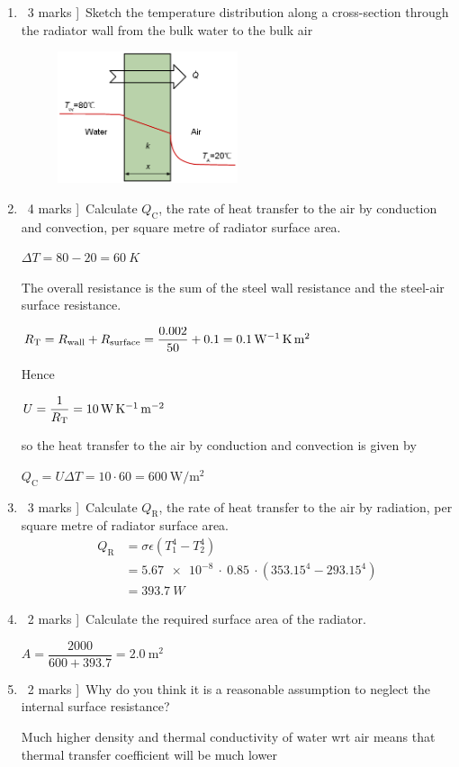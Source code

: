 \documentclass[a4paper,12pt,fleqn]{article}
\begin{document}
\begin{enumerate}[label=\alph*)]
\item \lbrack\ 3 marks ]\ Sketch the temperature distribution along a cross-section through the radiator wall from the bulk water to the bulk air
\begin{figure}[h]
\centering
\includegraphics[width=0.5\textwidth]{./figures/RadiatorTprofile}
\end{figure}

\item \lbrack\ 4 marks ]\ Calculate $Q_\mathrm{C}$, the rate of heat transfer to the air by conduction and  convection, per square metre of radiator surface area.\par

$\Delta T=80-20=\SI{60}{K}$\par	
The overall resistance is the sum of the steel wall resistance and the steel-air surface resistance.

$R_{\rm T}=R_{\rm wall}+R_{\rm surface}=\dfrac{0.002}{50}+0.1=\SI{0.1}{\per\watt\kelvin\metre\squared}$\par	
Hence\par
$U=\dfrac{1}{R_{\rm T}}=\SI{10}{\watt\per\kelvin\per\metre\squared}$\par
so the heat transfer to the air by conduction and convection is given by

$Q_\mathrm{C}=U\Delta T=10\cdot 60=\SI{600}{\watt\per\metre\squared}$

\item \lbrack\ 3 marks ]\ Calculate $Q_\mathrm{R}$,  the rate of heat transfer to the air by radiation, per square metre of radiator surface area.
\begin{align*}
Q_\mathrm{R}&=\sigma\epsilon (T_1^4-T_2^4)\\
&=\SI{5.67e-8}{}\cdot\ 0.85\ \cdot (353.15^4-293.15^4)\\
&=\SI{393.7}{W}
\end{align*}
\item \lbrack\ 2 marks ]\ Calculate the required surface area of the radiator.\par
$A=\dfrac{2000}{600+393.7}=\SI{2.0}{\metre\squared}$
\item \lbrack\ 2 marks ]\ Why do you think it is a reasonable assumption to neglect the internal surface resistance?\par
Much higher density and thermal conductivity of water wrt air means that thermal transfer coefficient will be much lower
\end{enumerate}
\end{document}
